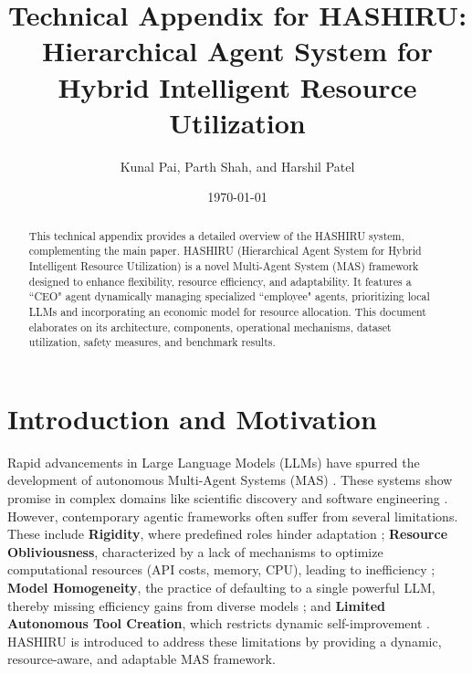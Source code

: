 \documentclass[twocolumn]{article}
\title{Technical Appendix for HASHIRU: Hierarchical Agent System for Hybrid Intelligent Resource Utilization}
\author{Kunal Pai, Parth Shah, and Harshil Patel}
\date{\today}
\begin{document}
\maketitle

\begin{abstract}
This technical appendix provides a detailed overview of the HASHIRU system, complementing the main paper. HASHIRU (Hierarchical Agent System for Hybrid Intelligent Resource Utilization) is a novel Multi-Agent System (MAS) framework designed to enhance flexibility, resource efficiency, and adaptability. It features a ``CEO" agent dynamically managing specialized ``employee" agents, prioritizing local LLMs and incorporating an economic model for resource allocation. This document elaborates on its architecture, components, operational mechanisms, dataset utilization, safety measures, and benchmark results.
\end{abstract}

\section{Introduction and Motivation}
Rapid advancements in Large Language Models (LLMs) \cite{brown2020language, devlin2019bert, raffel2020exploring} have spurred the development of autonomous Multi-Agent Systems (MAS) \cite{dorri2018multi, wooldridge2009introduction}. These systems show promise in complex domains like scientific discovery \cite{boiko2023emergent} and software engineering \cite{qian2023communicative}. However, contemporary agentic frameworks often suffer from several limitations. These include \textbf{Rigidity}, where predefined roles hinder adaptation \cite{zhang2023building}; \textbf{Resource Obliviousness}, characterized by a lack of mechanisms to optimize computational resources (API costs, memory, CPU), leading to inefficiency \cite{park2023generative}; \textbf{Model Homogeneity}, the practice of defaulting to a single powerful LLM, thereby missing efficiency gains from diverse models \cite{zhou2023agents}; and \textbf{Limited Autonomous Tool Creation}, which restricts dynamic self-improvement \cite{wang2023voyager, yao2022react, parisi2022talm}.
HASHIRU is introduced to address these limitations by providing a dynamic, resource-aware, and adaptable MAS framework.
\end{document}
